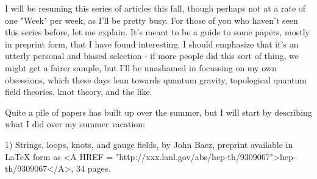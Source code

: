 

I will be resuming this series of articles this fall, though perhaps not
at a rate of one "Week" per week, as I'll be pretty busy.  For those of
you who haven't seen this series before, let me explain.  It's meant to
be a guide to some papers, mostly in preprint form, that I have found
interesting.  I should emphasize that it's an utterly personal and
biased selection - if more people did this sort of thing, we might get a
fairer sample, but I'll be unashamed in focussing on my own obsessions,
which these days lean towards quantum gravity, topological quantum field
theories, knot theory, and the like.  

Quite a pile of papers has built up over the summer, but I will start by
describing what I did over my summer vacation:

1) Strings, loops, knots, and gauge fields, by John Baez, preprint
available in LaTeX form as <A HREF = "http://xxx.lanl.gov/abs/hep-th/9309067">hep-th/9309067</A>, 34 pages.

